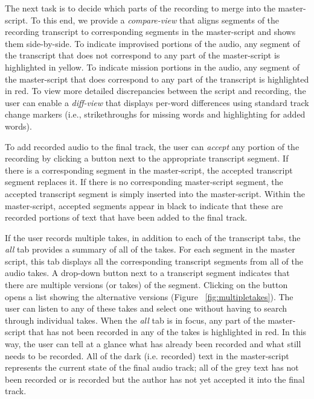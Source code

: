 The next task is to decide which parts of the recording to merge into the master-script. To this end, we provide a \textit{compare-view} that aligns segments of the recording transcript to corresponding segments in the master-script and shows them side-by-side. To indicate improvised portions of the audio, any segment of the transcript that does not correspond to any part of the master-script is highlighted in yellow. To indicate mission portions in the audio, any segment of the master-script that does correspond to any part of the transcript is highlighted in red. To
view more detailed discrepancies between the script and recording, the
user can enable a \textit{diff-view} that displays per-word differences
using standard track change markers (i.e., strikethroughs for
missing words and highlighting for added words). 


To add recorded audio to the final track, the user can \textit{accept} any portion of the recording by clicking a button next to the appropriate transcript segment. If there is a corresponding segment in the master-script, the accepted transcript segment replaces it. If there is no corresponding master-script segment, the accepted transcript segment is simply inserted into the master-script. Within the master-script, accepted segments appear in black to indicate that these are recorded portions of text that have been added to the final track. 


If the user records multiple takes, in addition to each of the transcript tabs, the \textit{all} tab provides a summary of all of the takes. For each segment in the master script, this tab displays all the corresponding transcript segments from all of the audio takes. A drop-down button next to a transcript segment  indicates that there are multiple versions (or takes)  of the  segment. Clicking on the button opens a list showing the alternative versions (Figure ~\ref{fig:multipletakes}). The user can listen to any of these takes and select one without having to search through individual takes. 
When the \textit{all} tab is in focus, any part of the master-script that has not been recorded in any of the takes is highlighted in red. In this way, the user can tell at a glance what has already been recorded and what still needs to be recorded. All of the dark (i.e. recorded) text in the master-script represents the current state of the final audio track; all of the grey text has not been recorded or is recorded but the author has not yet accepted it into the final track. 

